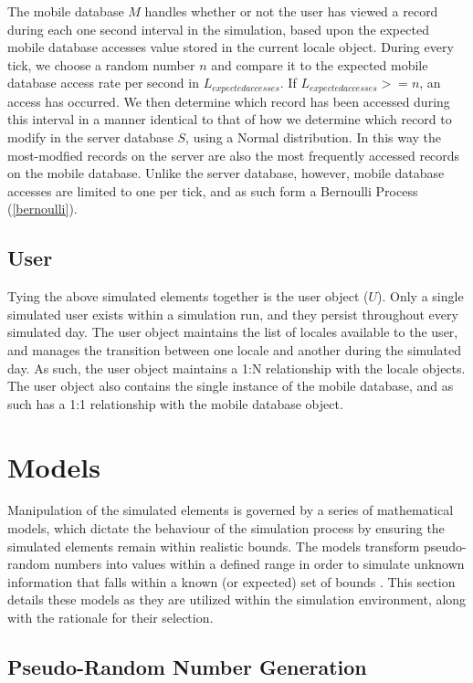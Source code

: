 The mobile database $M$ handles whether or not the user has viewed a record during each one second interval in the simulation, based upon the expected mobile database accesses value stored in the current locale object.  During every tick, we choose a random number $n$ and compare it to the expected mobile database access rate per second in $L_{expected accesses}$.  If $L_{expected accesses} >= n$, an access has occurred.  We then determine which record has been accessed during this interval in a manner identical to that of how we determine which record to modify in the server database $S$, using a Normal distribution.  In this way the most-modfied records on the server are also the most frequently accessed records on the mobile database.  Unlike the server database, however, mobile database accesses are limited to one per tick, and as such form a Bernoulli Process (\ref{bernoulli}).

\subsection{User}\label{user}

Tying the above simulated elements together is the user object ($U$).  Only a single simulated user exists within a simulation run, and they persist throughout every simulated day.  The user object maintains the list of locales available to the user, and manages the transition between one locale and another during the simulated day.  As such, the user object maintains a 1:N relationship with the locale objects.  The user object also contains the single instance of the mobile database, and as such has a 1:1 relationship with the mobile database object.

\section{Models}

Manipulation of the simulated elements is governed by a series of mathematical models, which dictate the behaviour of the simulation process by ensuring the simulated elements remain within realistic bounds.  The models transform pseudo-random numbers into values within a defined range in order to simulate unknown information that falls within a known (or expected) set of bounds \cite{RefWorks:38, RefWorks:40}.  This section details these models as they are utilized within the simulation environment, along with the rationale for their selection.

\subsection{Pseudo-Random Number Generation}\label{random_nums}

